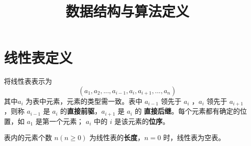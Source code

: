 \documentclass[12pt]{article}
\title{数据结构与算法定义}
\date{}
\begin{document}
\maketitle
\tableofcontents

\section{线性表定义}

将线性表表示为 $$(a_1, a_2, ..., a_{i-1}, a_i, a_{i+1}, ..., a_n)$$ 
其中$a_i$ 为表中元素，元素的类型需一致。表中 $a_{i-1}$ 领先于 $a_i$ ，$a_i$ 领先于 
$a_{i+1}$ ，则称 $a_{i-1}$ 是 $a_i$ 的\textbf{直接前驱}，$a_{i+1}$ 是 $a_i$ 的
\textbf{直接后继}。每个元素都有确定的位置，如 $a_1$ 是第一个元素；
$a_i$ 中的 $i$ 是该元素的\textbf{位序}。

表内的元素个数 $n(n\geq0)$ 为线性表的\textbf{长度}，$n=0$ 时，线性表为空表。
\end{document}
